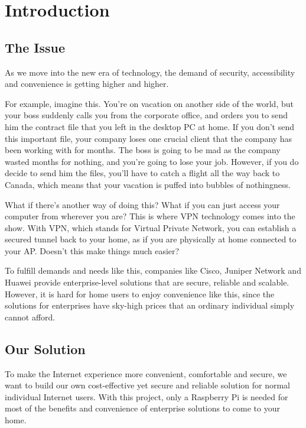 \documentclass[12pt]{article}
\begin{document}
\section{Introduction}

\subsection{The Issue}
As we move into the new era of technology, the demand of security, accessibility and convenience is getting higher and higher.

For example, imagine this. You're on vacation on another side of the world, but your boss suddenly calls you from the corporate office, and orders you to send him the contract file that you left in the desktop PC at home. If you don't send this important file, your company loses one crucial client that the company has been working with for months. The boss is going to be mad as the company wasted months for nothing, and you're going to lose your job. However, if you do decide to send him the files, you'll have to catch a flight all the way back to Canada, which means that your vacation is puffed into bubbles of nothingness.

What if there's another way of doing this? What if you can just access your computer from wherever you are? This is where VPN technology comes into the show. With VPN, which stands for Virtual Private Network, you can establish a secured tunnel back to your home, as if you are physically at home connected to your AP. Doesn't this make things much easier?

To fulfill demands and needs like this, companies like Cisco, Juniper Network and Huawei provide enterprise-level solutions that are secure, reliable and scalable. However, it is hard for home users to enjoy convenience like this, since the solutions for enterprises have sky-high prices that an ordinary individual simply cannot afford.

\subsection{Our Solution}

To make the Internet experience more convenient, comfortable and secure, we want to build our own cost-effective yet secure and reliable solution for normal individual Internet users. With this project, only a Raspberry Pi is needed for most of the benefits and convenience of enterprise solutions to come to your home.
\end{document}
